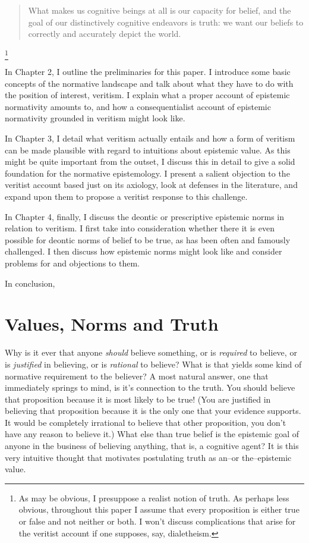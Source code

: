 \documentclass[12pt,numbers=noenddot]{scrartcl}
\begin{document}
\begin{quote}
What makes us cognitive beings at all is our capacity for belief, and the goal of our distinctively cognitive endeavors is truth: we want our beliefs to correctly and accurately depict the world. \textcite[7]{Bonjour1985}
\end{quote}

\footnote{As may be obvious, I presuppose a realist notion of truth. As perhaps less obvious, throughout this paper I assume that every proposition is either true or false and not neither or both. I won't discuss complications that arise for the veritist account if one supposes, say, dialetheism.}

In Chapter 2, I outline the preliminaries for this paper. I introduce some basic concepts of the normative landscape and talk about what they have to do with the position of interest, veritism. I explain what a proper account of epistemic normativity amounts to, and how a consequentialist account of epistemic normativity grounded in veritism might look like.

In Chapter 3, I detail what veritism actually entails and how a form of veritism can be made plausible with regard to intuitions about epistemic value. As this might be quite important from the outset, I discuss this in detail to give a solid foundation for the normative epistemology. I present a salient objection to the veritist account based just on its axiology, look at defenses in the literature, and expand upon them to propose a veritist response to this challenge.

In Chapter 4, finally, I discuss the deontic or prescriptive epistemic norms in relation to veritism. I first take into consideration whether there it is even possible for deontic norms of belief to be true, as has been often and famously challenged. I then discuss how epistemic norms might look like and consider problems for and objections to them.

In conclusion,

\clearpage

\section{Values, Norms and Truth}\label{sec:values}

Why is it ever that anyone \emph{should} believe something, or is \emph{required} to believe, or is \emph{justified} in believing, or is \emph{rational} to believe? What is that yields some kind of normative requirement to the believer? A most natural answer, one that immediately springs to mind, is it's connection to the truth. You should believe that proposition because it is most likely to be true! (You are justified in believing that proposition because it is the only one that your evidence supports. It would be completely irrational to believe that other proposition, you don't have any reason to believe it.) What else than true belief is the epistemic goal of anyone in the business of believing anything, that is, a cognitive agent? It is this very intuitive thought that motivates postulating truth as an–or the–epistemic value.
\end{document}
